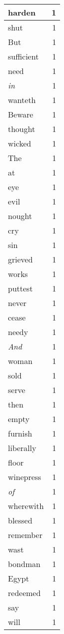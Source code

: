 \begin{center}
\begin{longtable}{l|r}
harden & 1 \\ \hline
shut & 1 \\ \hline
But & 1 \\ \hline
sufficient & 1 \\ \hline
need & 1 \\ \hline
\emph{in} & 1 \\ \hline
wanteth & 1 \\ \hline
Beware & 1 \\ \hline
thought & 1 \\ \hline
wicked & 1 \\ \hline
The & 1 \\ \hline
at & 1 \\ \hline
eye & 1 \\ \hline
evil & 1 \\ \hline
nought & 1 \\ \hline
cry & 1 \\ \hline
sin & 1 \\ \hline
grieved & 1 \\ \hline
works & 1 \\ \hline
puttest & 1 \\ \hline
never & 1 \\ \hline
cease & 1 \\ \hline
needy & 1 \\ \hline
\emph{And} & 1 \\ \hline
woman & 1 \\ \hline
sold & 1 \\ \hline
serve & 1 \\ \hline
then & 1 \\ \hline
empty & 1 \\ \hline
furnish & 1 \\ \hline
liberally & 1 \\ \hline
floor & 1 \\ \hline
winepress & 1 \\ \hline
\emph{of} & 1 \\ \hline
wherewith & 1 \\ \hline
blessed & 1 \\ \hline
remember & 1 \\ \hline
wast & 1 \\ \hline
bondman & 1 \\ \hline
Egypt & 1 \\ \hline
redeemed & 1 \\ \hline
say & 1 \\ \hline
will & 1 \\ \hline

\end{longtable}
\end{center}
